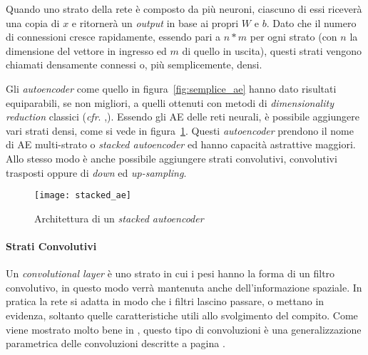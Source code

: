 Quando uno strato della rete è composto da più neuroni, ciascuno di essi riceverà una copia di $x$ e ritornerà un \textit{output} in base ai propri $W$ e $b$.
Dato che il numero di connessioni cresce rapidamente, essendo pari a $n*m$ per ogni strato (con $n$ la dimensione del vettore in ingresso ed $m$ di quello in uscita), questi strati vengono chiamati densamente connessi o, più semplicemente, densi.

Gli \textit{autoencoder} come quello in figura~\ref{fig:semplice_ae} hanno dato risultati equiparabili, se non migliori, a quelli ottenuti con metodi di \textit{dimensionality reduction} classici (\textit{cfr}. \cite{ng_sparse_ae},\cite{pca_vs_ae_1}).
Essendo gli AE delle reti neurali, è possibile aggiungere vari strati densi, come si vede in figura~\ref{fig:stacked_ae}.
Questi \textit{autoencoder} prendono il nome di AE multi-strato o \textit{stacked autoencoder} ed hanno capacità astrattive maggiori. %
Allo stesso modo è anche possibile aggiungere strati convolutivi, convolutivi trasposti oppure di \textit{down} ed \textit{up-sampling}.

\begin{figure}[ht] %
  \begin{center}
    \centering\texttt{[image: stacked\_ae]}
  \end{center}
  \caption{Architettura di un \textit{stacked autoencoder}}
  \label{fig:stacked_ae}
\end{figure}

\paragraph{Strati Convolutivi}
Un \textit{convolutional layer} è uno strato in cui i pesi hanno la forma di un filtro convolutivo, in questo modo verrà mantenuta anche dell'informazione spaziale.
In pratica la rete si adatta in modo che i filtri lascino passare, o mettano in evidenza, soltanto quelle caratteristiche utili allo svolgimento del compito.
Come viene mostrato molto bene in \cite{conv_arithm}, questo tipo di convoluzioni è una generalizzazione parametrica delle convoluzioni descritte a pagina \pageref{conv_para}.

